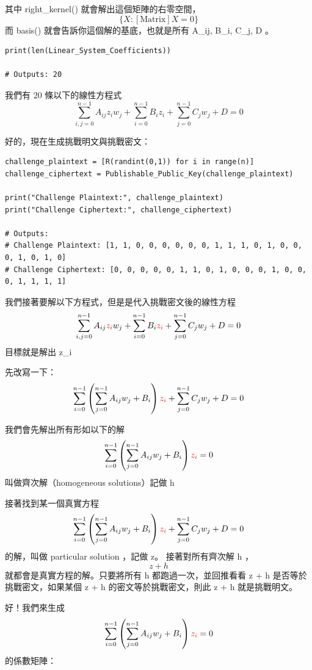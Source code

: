 \documentclass[
]{article}
\begin{document}
其中 right\_kernel() 就會解出這個矩陣的右零空間， \[
\{X : [\text{Matrix}] X = 0\}
\] 而 basis() 就會告訴你這個解的基底，也就是所有 A\_ij, B\_i, C\_j, D 。

\begin{verbatim}
print(len(Linear_System_Coefficients))

# Outputs: 20
\end{verbatim}

我們有 20 條以下的線性方程式 \[
\sum_{i,j=0}^{n-1} A_{ij}z_{i}w_{j} + 
\sum_{i=0}^{n-1} B_{i}z_{i} + 
\sum_{j=0}^{n-1} C_{j}w_{j} + D =0 
\]

好的，現在生成挑戰明文與挑戰密文：

\begin{verbatim}
challenge_plaintext = [R(randint(0,1)) for i in range(n)]
challenge_ciphertext = Publishable_Public_Key(challenge_plaintext)

print("Challenge Plaintext:", challenge_plaintext)
print("Challenge Ciphertext:", challenge_ciphertext)

# Outputs: 
# Challenge Plaintext: [1, 1, 0, 0, 0, 0, 0, 0, 1, 1, 1, 0, 1, 0, 0, 0, 1, 0, 1, 0]
# Challenge Ciphertext: [0, 0, 0, 0, 0, 1, 1, 0, 1, 0, 0, 0, 1, 0, 0, 0, 1, 1, 1, 1]
\end{verbatim}

我們接著要解以下方程式，但是是代入挑戰密文後的線性方程 \[
\sum_{i,j=0}^{n-1} A_{ij}{\color{red} z_{i}}{w_{j} }+ 
\sum_{i=0}^{n-1} B_{i}{\color{red} z_{i}} + 
\sum_{j=0}^{n-1} C_{j}w_{j} + D =0 
\] 目標就是解出 z\_i

先改寫一下： \[
\sum_{i=0}^{n-1} \left( \sum_{j=0}^{n-1} A_{ij}w_{j} +B_{i}\right){\color{red}z_{i}} + 
\sum_{j=0}^{n-1} C_{j}w_{j} + D =0
\]

我們會先解出所有形如以下的解 \[
\sum_{i=0}^{n-1} \left( \sum_{j=0}^{n-1} A_{ij}w_{j} +B_{i}\right){\color{red}z_{i}} =0
\] 叫做齊次解（homogeneous solutions）記做 h

接著找到某一個真實方程 \[
\sum_{i=0}^{n-1} \left( \sum_{j=0}^{n-1} A_{ij}w_{j} +B_{i}\right){\color{red}z_{i}} + 
\sum_{j=0}^{n-1} C_{j}w_{j} + D =0
\] 的解，叫做 particular solution ，記做 z。 接著對所有齊次解 h ， \[
z +h
\] 就都會是真實方程的解。只要將所有 h 都跑過一次，並回推看看 z + h
是否等於挑戰密文，如果某個 z + h 的密文等於挑戰密文，則此 z + h
就是挑戰明文。

好！我們來生成 \[
\sum_{i=0}^{n-1} \left( \sum_{j=0}^{n-1} A_{ij}w_{j} +B_{i}\right){\color{red}z_{i}} =0
\] 的係數矩陣：
\end{document}

